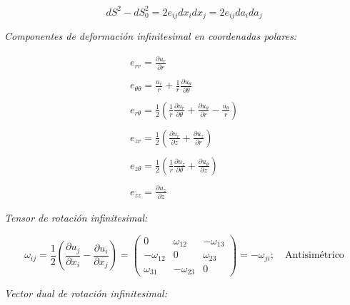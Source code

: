 \documentclass[a4paper,10pt,twoside,final,spanish]{article}
\begin{document}
\begin{equation}
dS^{2}-dS_{0}^{2}=2e_{ij}dx_{i}dx_{j}=2e_{ij}da_{i}da_{j}
\end{equation}

\textit{Componentes de deformación infinitesimal en coordenadas polares:}

\begin{equation}
\begin{array}{l}
\displaystyle e_{rr}=\frac{\partial u_{r}}{\partial r}                  \\ \\
\displaystyle e_{\theta\theta}
=\frac{u_{r}}{r}+\frac{1}{r}\frac{\partial u_{\theta}}{\partial \theta} \\ \\
\displaystyle e_{r\theta}
=\frac{1}{2}\left(\frac{1}{r}\frac{\partial u_{r}}{\partial\theta}
+\frac{\partial u_{\theta}}{\partial r}-\frac{u_{\theta}}{r}\right)     \\ \\
\displaystyle e_{zr}=\frac{1}{2}\left(\frac{\partial u_{r}}{\partial z}
+\frac{\partial u_{z}}{\partial r}\right)                               \\ \\
\displaystyle e_{z\theta}=\frac{1}{2}\left(\frac{1}{r}
\frac{\partial u_{z}}{\partial\theta}
+\frac{\partial u_{\theta}}{\partial z}\right)                          \\ \\
\displaystyle e_{zz}=\frac{\partial u_{z}}{\partial z}
\end{array}
\end{equation}

\textit{Tensor de rotación infinitesimal:}

\begin{equation}
\omega_{ij}=\frac{1}{2}\left(
\frac{\partial u_{j}}{\partial x_{i}}-
\frac{\partial u_{i}}{\partial x_{j}}
\right)
=
\begin{pmatrix}
0            & \omega_{12}  & -\omega_{13} \\
-\omega_{12} & 0            & \omega_{23}  \\
\omega_{31}  & -\omega_{23} & 0
\end{pmatrix}
=-\omega_{ji};
\quad \mbox{Antisimétrico}
\end{equation}

\textit{Vector dual de rotación infinitesimal:}\\
\end{document}
